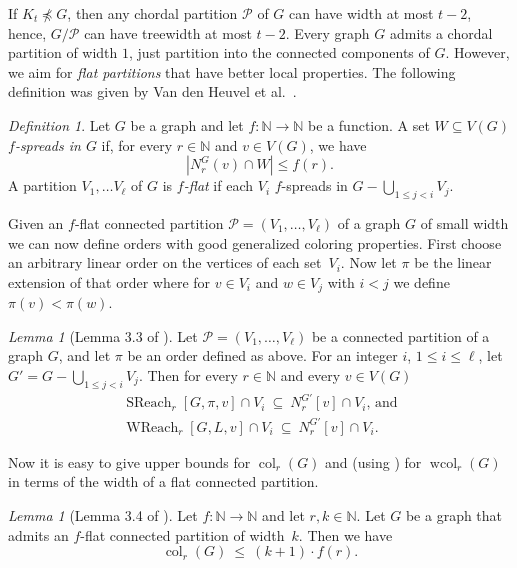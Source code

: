 \documentclass[1p,number,a4paper]{elsarticle}
\theoremstyle{remark}
\newcommand{\Pp}{\mathcal{P}}
\newcommand{\minor}{\preccurlyeq}
\newcommand{\N}{\mathbb{N}}
\DeclareMathOperator{\col}{col}
\DeclareMathOperator{\wcol}{wcol}
\DeclareMathOperator{\WReach}{WReach}
\DeclareMathOperator{\SReach}{SReach}
\newtheorem{definition}[theorem]{Definition}
\newtheorem{lemma}[theorem]{Lemma}
\begin{document}
If $K_t\not\minor G$, then any chordal partition $\Pp$ of $G$ can have width at most $t-2$, hence, $G/\Pp$ can have treewidth at most $t-2$. 
Every graph $G$ admits a chordal partition of width $1$, just partition into the connected components of $G$. However, we aim for \emph{flat partitions} that have better local properties. 
The following definition was given by Van den Heuvel et al.~\cite{van2017generalised}. 

\begin{definition}
  Let $G$ be a graph and let
$f:\N\to\N$ be a function. A set $W\subseteq V(G)$ \emph{$f$-spreads in $G$} if,
for every $r\in\N$ and $v\in V(G)$, we have
\[|N^G_r(v)\cap W|\le f(r).\]
A partition $V_1,\ldots V_\ell$ of $G$ is \emph{$f$-flat} if each
$V_i$ $f$-spreads in $G-\bigcup_{1\le j<i}V_j$. 
\end{definition}

Given an $f$-flat connected partition $\Pp=(V_1,\ldots, V_\ell)$ of a graph $G$ of small width we can now define orders with good generalized coloring properties. 
First choose an arbitrary linear
order on the vertices of each set~$V_i$. Now let $\pi$ be the linear
extension of that order where for $v\in V_i$ and $w\in V_j$ with
$i<j$ we define $\pi(v)<\pi(w)$.

\begin{lemma}[Lemma 3.3 of \cite{van2017generalised}]\label{lem:deletevertices}
  Let $\Pp=(V_1,\ldots, V_\ell)$ be a connected partition of a graph $G$,
  and let $\pi$ be an order defined as above. For an integer
  $i$, $1\le i\le\ell$, let $G'= G-\bigcup_{1\le j<i} V_j$. Then
  for every $r\in\N$ and every $v\in V(G)$
  \begin{eqnarray*}
    \SReach_r[G,\pi,v]\cap V_i\:\subseteq\: N_r^{G'}[v]\cap V_i \text{, and}\\
    \WReach_r[G,L,v]\cap V_i\:\subseteq\: N_r^{G'}[v]\cap V_i.
  \end{eqnarray*}
\end{lemma}

Now it is easy to give upper bounds for $\col_r(G)$ and (using ) for
$\wcol_r(G)$ in terms of the width of a flat connected partition.

\begin{lemma}[Lemma 3.4 of \cite{van2017generalised}]\label{lem:spd}
  Let $f:\N\to \N$ and let $r,k\in\N$. Let $G$ be a graph that admits an
  $f$-flat connected partition of width~$k$. Then we have
  \begin{equation*}
    \col_r(G)\:\le\: (k+1)\cdot f(r).
  \end{equation*}
\end{lemma}
\end{document}
